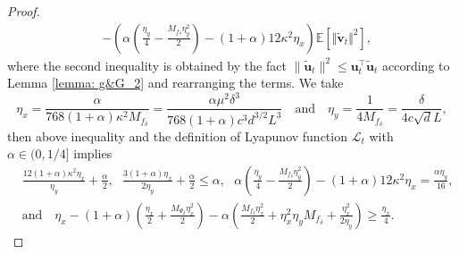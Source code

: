 \documentclass[11pt]{article}
\def\vu{\mathbf{u}}
\def\vv{\mathbf{v}}
\begin{document}
\begin{proof}
\begin{align}
& - \left( \alpha \left( \frac{\eta_y}{4} - \frac{M_{f_\delta} \eta_y^2}{2} \right) -(1+\alpha) 12 \kappa^2 \eta_x\right) \mathbb{E}\left[   \Vert \tilde{\vv}_t  \Vert^2 \right], \label{eq: (1+alpha) Psi - f}
\end{align}
where the second inequality is obtained by the fact $\|\tilde{\vu}_t\|^2
\le\vu_t^\top\tilde{\vu}_t$ according to Lemma \ref{lemma: g&G_2} and rearranging the terms.
We take  
\[
\eta_x=\frac{\alpha}{768(1+\alpha)\kappa^2 M_{f_\delta}}
=\frac{\alpha\mu^2\delta^3}{768(1+\alpha)c^3d^{3/2}L^3}
\quad \text{and}\quad
\eta_y=\frac{1}{4 M_{f_\delta}}= \frac{\delta}{4c\sqrt{d}L},
\]
then above inequality 
and the definition of Lyapunov function $\mathcal{L}_t$ with $\alpha \in (0,1/4]$ implies
\begin{align*}
    & \frac{12(1+\alpha) \kappa^2 \eta_x}{\eta_y} + \frac{\alpha}{2} ,~~~
     \frac{3(1+\alpha) \eta_x}{2\eta_y}  + \frac{\alpha}{2} \le \alpha,~~~
    \alpha \left( \frac{\eta_y}{4} - \frac{M_{f_\delta} \eta_y^2}{2} \right) -(1+\alpha) 12\kappa^2 \eta_x =\frac{\alpha \eta_y}{16}, \\
    & \text{and} \quad \eta_x- (1+\alpha) \left(\frac{\eta_x}{2} + \frac{M_{\Psi_\delta} \eta_x^2}{2} \right) - \alpha \left( \frac{M_{f_\delta}\eta_x^2 }{2} +\eta_x^2 \eta_y M_{f_\delta}   +\frac{ \eta_x^2}{2\eta_y}\right) 
    \geq \frac{\eta_x}{4}.
\end{align*}


\end{proof}
\end{document}
